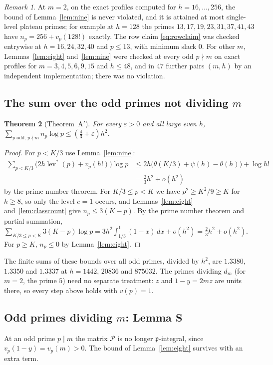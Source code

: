 \documentclass[11pt]{amsart}
\newtheorem{theorem}{Theorem}[section]
\theoremstyle{definition}
\theoremstyle{remark}
\newtheorem{remark}[theorem]{Remark}
\numberwithin{equation}{section}
\newcommand{\cP}{\mathcal{P}}
\newcommand{\fp}{\mathfrak{p}}
\newcommand{\eps}{\varepsilon}
\newcommand{\lev}{\operatorname{lev}^{*}}
\begin{document}
\begin{remark}
At $m=2$, on the exact profiles computed for $h=16,\dots,256$, the bound of Lemma~\ref{lem:nine} is never violated, and
it is attained at most single-level plateau primes; for example at $h=128$ the primes $13,17,19,23,31,37,41,43$ have
$n_p=256+v_p(128!)$ exactly. The row claim \eqref{eq:rowclaim} was checked entrywise at $h=16,24,32,40$ and $p\le13$, with
minimum slack $0$. For other $m$, Lemmas~\ref{lem:eight} and~\ref{lem:nine} were checked at every odd $p\nmid m$ on exact
profiles for $m=3,4,5,6,9,15$ and $h\le48$, and in $47$ further pairs $(m,h)$ by an independent implementation; there
was no violation.
\end{remark}

\subsection{The sum over the odd primes not dividing \texorpdfstring{$m$}{m}}\label{sec:oddsum}

\begin{theorem}[Theorem~A$'$]\label{thm:A}
For every $\eps>0$ and all large even $h$, $\sum_{p\text{ odd},\,p\nmid m}n_p\log p\le(\frac43+\eps)h^2$.
\end{theorem}

\begin{proof}
For $p<K/3$ use Lemma~\ref{lem:nine}:
\begin{align*}
  \sum_{p<K/3}\bigl(2h\lev(p)+v_p(h!)\bigr)\log p&\le2h\bigl(\theta(K/3)+\psi(h)-\theta(h)\bigr)+\log h!\\
  &=\tfrac23h^2+o(h^2)
\end{align*}
by the prime number theorem. For $K/3\le p<K$ we have $p^2\ge K^2/9\ge K$ for $h\ge8$, so only the level $e=1$ occurs,
and Lemmas~\ref{lem:eight} and~\ref{lem:classcount} give $n_p\le3(K-p)$. By the prime number theorem and partial
summation, $\sum_{K/3\le p<K}3(K-p)\log p=3h^2\int_{1/3}^1(1-x)\,dx+o(h^2)=\frac23h^2+o(h^2)$. For $p\ge K$,
$n_p\le0$ by Lemma~\ref{lem:eight}.
\end{proof}

The finite sums of these bounds over all odd primes, divided by $h^2$, are $1.3380$, $1.3350$ and $1.3337$ at $h=1442$,
$20836$ and $875032$. The primes dividing $d_m$ (for $m=2$, the prime $5$) need no separate treatment: $z$ and $1-y=2mz$
are units there, so every step above holds with $v(p)=1$.

\subsection{Odd primes dividing \texorpdfstring{$m$}{m}: Lemma S}\label{sec:special}
At an odd prime $p\mid m$ the matrix $\cP$ is no longer $\fp$-integral, since $v_p(1-y)=v_p(m)>0$. The bound of
Lemma~\ref{lem:eight} survives with an extra term.
\end{document}

